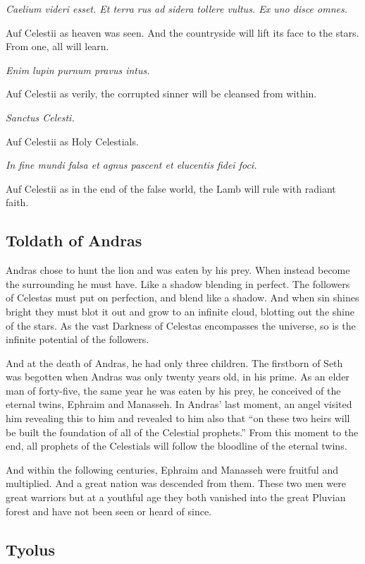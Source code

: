 \textit{Caelium videri esset. Et terra rus ad sidera tollere vultus. Ex uno disce omnes.}

Auf Celestii as heaven was seen. And the countryside will lift its face to the stars. From one, all will learn.

\textit{Enim lupin purnum pravus intus.}

Auf Celestii as verily, the corrupted sinner will be cleansed from within.

\textit{Sanctus Celesti.}

Auf Celestii as Holy Celestials.

\textit{In fine mundi falsa et agnus pascent et elucentis fidei foci.}

Auf Celestii as in the end of the false world, the Lamb will rule with radiant faith.

\subsection{Toldath of Andras}

Andras chose to hunt the lion and was eaten by his prey. When instead become the surrounding he must have. Like a shadow blending in perfect. The followers of Celestas must put on perfection, and blend like a shadow. And when sin shines bright they must blot it out and grow to an infinite cloud, blotting out the shine of the stars. As the vast Darkness of Celestas encompasses the universe, so is the infinite potential of the followers.

And at the death of Andras, he had only three children. The firstborn of Seth was begotten when Andras was only twenty years old, in his prime. As an elder man of forty-five, the same year he was eaten by his prey, he conceived of the eternal twins, Ephraim and Manasseh. In Andras’ last moment, an angel visited him revealing this to him and revealed to him also that “on these two heirs will be built the foundation of all of the Celestial prophets.” From this moment to the end, all prophets of the Celestials will follow the bloodline of the eternal twins.

And within the following centuries, Ephraim and Manasseh were fruitful and multiplied. And a great nation was descended from them. These two men were great warriors but at a youthful age they both vanished into the great Pluvian forest and have not been seen or heard of since. 

\subsection{Tyolus}

